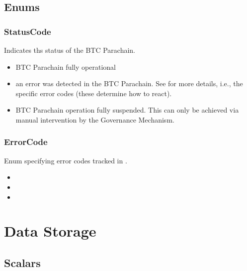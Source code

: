 \documentclass[a4paper,10pt,english]{sphinxmanual}
\begin{document}
\subsection{Enums}
\label{\detokenize{spec/security:enums}}

\subsubsection{StatusCode}
\label{\detokenize{spec/security:statuscode}}
Indicates ths status of the BTC Parachain.
\begin{itemize}
\item {} 
 \sphinxhyphen{} BTC Parachain fully operational

\item {} 
\sphinxhyphen{} an error was detected in the BTC Parachain. See  for more details, i.e., the specific error codes (these determine how to react).

\item {} 
 \sphinxhyphen{} BTC Parachain operation fully suspended. This can only be achieved via manual intervention by the Governance Mechanism.

\end{itemize}


\subsubsection{ErrorCode}
\label{\detokenize{spec/security:errorcode}}
Enum specifying error codes tracked in .
\begin{itemize}
\item {} 

\item {} 

\item {} 

\end{itemize}


\section{Data Storage}
\label{\detokenize{spec/security:data-storage}}

\subsection{Scalars}
\label{\detokenize{spec/security:scalars}}
\end{document}
